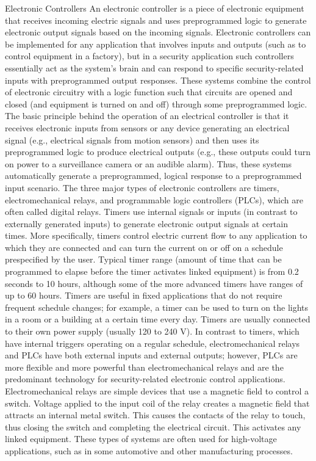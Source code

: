 \documentclass{article}
\begin{document}
Electronic Controllers An electronic controller is a piece of electronic
equipment that receives incoming electric signals and uses preprogrammed
logic to generate electronic output signals based on the incoming
signals. Electronic controllers can be implemented for any application
that involves inputs and outputs (such as to control equipment in a
factory), but in a security application such controllers essentially act
as the system's brain and can respond to specific security-related
inputs with preprogrammed output responses. These systems combine the
control of electronic circuitry with a logic function such that circuits
are opened and closed (and equipment is turned on and off) through some
preprogrammed logic. The basic principle behind the operation of an
electrical controller is that it receives electronic inputs from sensors
or any device generating an electrical signal (e.g., electrical signals
from motion sensors) and then uses its preprogrammed logic to produce
electrical outputs (e.g., these outputs could turn on power to a
surveillance camera or an audible alarm). Thus, these systems
automatically generate a preprogrammed, logical response to a
preprogrammed input scenario. The three major types of electronic
controllers are timers, electromechanical relays, and programmable logic
controllers (PLCs), which are often called digital relays. Timers use
internal signals or inputs (in contrast to externally generated inputs)
to generate electronic output signals at certain times. More
specifically, timers control electric current flow to any application to
which they are connected and can turn the current on or off on a
schedule prespecified by the user. Typical timer range (amount of time
that can be programmed to elapse before the timer activates linked
equipment) is from 0.2 seconds to 10 hours, although some of the more
advanced timers have ranges of up to 60 hours. Timers are useful in
fixed applications that do not require frequent schedule changes; for
example, a timer can be used to turn on the lights in a room or a
building at a certain time every day. Timers are usually connected to
their own power supply (usually 120 to 240 V). In contrast to timers,
which have internal triggers operating on a regular schedule,
electromechanical relays and PLCs have both external inputs and external
outputs; however, PLCs are more flexible and more powerful than
electromechanical relays and are the predominant technology for
security-related electronic control applications. Electromechanical
relays are simple devices that use a magnetic field to control a switch.
Voltage applied to the input coil of the relay creates a magnetic field
that attracts an internal metal switch. This causes the contacts of the
relay to touch, thus closing the switch and completing the electrical
circuit. This activates any linked equipment. These types of systems are
often used for high-voltage applications, such as in some automotive and
other manufacturing processes.
\end{document}

